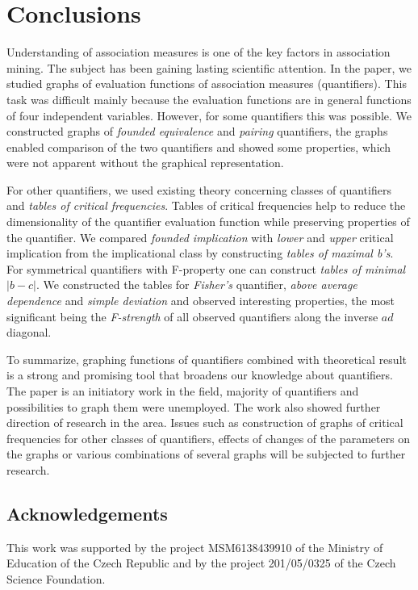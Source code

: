 \section{Conclusions} \label{Conclusions}
Understanding of association measures is one of the key factors in association mining\cite{Han:07,HeCr,TKS:02}. The subject has been gaining lasting scientific attention. In the paper, we studied graphs of evaluation functions of association measures (quantifiers). This task was difficult mainly because the evaluation functions are in general functions of four independent variables. However, for some quantifiers this was possible. We constructed graphs of \emph{founded equivalence} and \emph{pairing} quantifiers, the graphs enabled comparison of the two quantifiers and showed some properties, which were not apparent without the graphical representation. 

For other quantifiers, we used existing theory concerning classes of quantifiers and \emph{tables of critical frequencies}. Tables of critical frequencies help to reduce the dimensionality of the quantifier evaluation function while preserving properties of the quantifier. We compared \emph{founded implication} with \emph{lower} and \emph{upper} critical implication from the implicational class by constructing \emph{tables of maximal b's}. For symmetrical quantifiers with F-property one can construct \emph{tables of minimal $|b-c|$}. We constructed the tables for \emph{Fisher's} quantifier, \emph{above average dependence} and \emph{simple deviation} and observed interesting properties, the most significant being the \emph{F-strength} of all observed quantifiers along the inverse $ad$ diagonal.

To summarize, graphing functions of quantifiers combined with theoretical result is a strong and promising tool that broadens our knowledge about quantifiers. The paper is an initiatory work in the field, majority of quantifiers and possibilities to graph them were unemployed. The work also showed further direction of research in the area. Issues such as construction of graphs of critical frequencies for other classes of quantifiers, effects of changes of the parameters on the graphs or various combinations of several graphs will be subjected to further research. 

\subsection*{Acknowledgements}
This work was supported by the project MSM6138439910 of the Ministry of Education of the Czech Republic and by the project 201/05/0325 of the Czech Science Foundation.